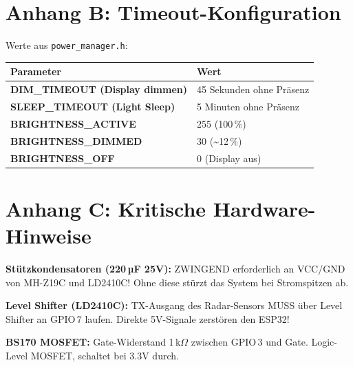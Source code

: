 \documentclass[a4paper,11pt]{article}
\begin{document}
\section{Anhang B: Timeout-Konfiguration}

Werte aus \texttt{power\_manager.h}:

\begin{longtable}{p{6cm} p{7cm}}
\toprule
\rowcolor{tableheader}
\textbf{Parameter} & \textbf{Wert} \\
\midrule
\endhead
\textbf{DIM\_TIMEOUT (Display dimmen)}   & 45 Sekunden ohne Präsenz \\
\textbf{SLEEP\_TIMEOUT (Light Sleep)}    & 5 Minuten ohne Präsenz \\
\textbf{BRIGHTNESS\_ACTIVE}              & 255 (100\,\%) \\
\textbf{BRIGHTNESS\_DIMMED}              & 30 (\textasciitilde12\,\%) \\
\textbf{BRIGHTNESS\_OFF}                 & 0 (Display aus) \\
\bottomrule
\end{longtable}

\section{Anhang C: Kritische Hardware-Hinweise}

\textbf{Stützkondensatoren (220\,µF 25V):} ZWINGEND erforderlich an VCC/GND von MH-Z19C und LD2410C! Ohne diese stürzt das System bei Stromspitzen ab.

\textbf{Level Shifter (LD2410C):} TX-Ausgang des Radar-Sensors MUSS über Level Shifter an GPIO\,7 laufen. Direkte 5V-Signale zerstören den ESP32!

\textbf{BS170 MOSFET:} Gate-Widerstand 1\,k$\Omega$ zwischen GPIO\,3 und Gate. Logic-Level MOSFET, schaltet bei 3.3V durch.
\end{document}

